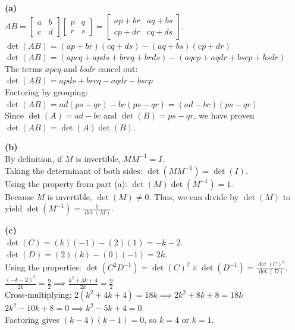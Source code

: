 \begin{solution}
\textbf{(a)} \\
$AB = \begin{bmatrix} a & b \\ c & d \end{bmatrix} \begin{bmatrix} p & q \\ r & s \end{bmatrix} = \begin{bmatrix} ap+br & aq+bs \\ cp+dr & cq+ds \end{bmatrix}$. \\
$\det(AB) = (ap+br)(cq+ds) - (aq+bs)(cp+dr)$ \\
$\det(AB) = (apcq + apds + brcq + brds) - (aqcp + aqdr + bscp + bsdr)$ \\
The terms $apcq$ and $bsdr$ cancel out: \\
$\det(AB) = apds + brcq - aqdr - bscp$ \\
Factoring by grouping: \\
$\det(AB) = ad(ps-qr) - bc(ps-qr) = (ad-bc)(ps-qr)$ \\
Since $\det(A) = ad-bc$ and $\det(B) = ps-qr$, we have proven $\det(AB) = \det(A)\det(B)$.

\medskip
\textbf{(b)} \\
By definition, if $M$ is invertible, $M M^{-1} = I$. \\
Taking the determinant of both sides: $\det(MM^{-1}) = \det(I)$. \\
Using the property from part (a): $\det(M)\det(M^{-1}) = 1$. \\
Because $M$ is invertible, $\det(M) \neq 0$. Thus, we can divide by $\det(M)$ to yield $\det(M^{-1}) = \frac{1}{\det(M)}$.

\medskip
\textbf{(c)} \\
$\det(C) = (k)(-1) - (2)(1) = -k - 2$. \\
$\det(D) = (2)(k) - (0)(-1) = 2k$. \\
Using the properties: $\det(C^2 D^{-1}) = \det(C)^2 \times \det(D^{-1}) = \frac{\det(C)^2}{\det(D)}$. \\
$\frac{(-k-2)^2}{2k} = \frac{9}{2} \implies \frac{k^2+4k+4}{2k} = \frac{9}{2}$ \\
Cross-multiplying: $2(k^2+4k+4) = 18k \implies 2k^2 + 8k + 8 = 18k$ \\
$2k^2 - 10k + 8 = 0 \implies k^2 - 5k + 4 = 0$. \\
Factoring gives $(k-4)(k-1) = 0$, so $k = 4$ or $k = 1$.


\end{solution}

